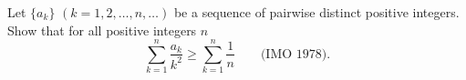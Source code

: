 Let $\{a_k\}$ $(k = 1, 2, \ldots, n, \ldots)$ be a sequence of pairwise distinct positive integers. Show that for all positive integers $n$
\[ \sum_{k=1}^n \frac{a_k}{k^2} \geq \sum_{k=1}^n \frac{1}{n} \qquad \text{(IMO 1978).} \]
